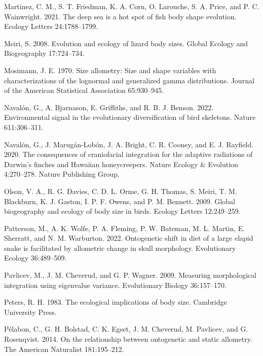 \documentclass[
  11pt,
]{article}
\begin{document}
\leavevmode\hypertarget{ref-Martinez2021}{}%
Martinez, C. M., S. T. Friedman, K. A. Corn, O. Larouche, S. A. Price,
and P. C. Wainwright. 2021. The deep sea is a hot spot of fish body
shape evolution. Ecology Letters 24:1788--1799.

\leavevmode\hypertarget{ref-Meiri2008}{}%
Meiri, S. 2008. Evolution and ecology of lizard body sizes. Global
Ecology and Biogeography 17:724--734.

\leavevmode\hypertarget{ref-Mosimann1970}{}%
Mosimann, J. E. 1970. Size allometry: Size and shape variables with
characterizations of the lognormal and generalized gamma distributions.
Journal of the American Statistical Association 65:930--945.

\leavevmode\hypertarget{ref-Navalon2022}{}%
Navalón, G., A. Bjarnason, E. Griffiths, and R. B. J. Benson. 2022.
Environmental signal in the evolutionary diversification of bird
skeletons. Nature 611:306--311.

\leavevmode\hypertarget{ref-Navalon2020}{}%
Navalón, G., J. Marugán-Lobón, J. A. Bright, C. R. Cooney, and E. J.
Rayfield. 2020. The consequences of craniofacial integration for the
adaptive radiations of Darwin's finches and Hawaiian honeycreepers.
Nature Ecology \& Evolution 4:270--278. Nature Publishing Group.

\leavevmode\hypertarget{ref-Olson2009}{}%
Olson, V. A., R. G. Davies, C. D. L. Orme, G. H. Thomas, S. Meiri, T. M.
Blackburn, K. J. Gaston, I. P. F. Owens, and P. M. Bennett. 2009. Global
biogeography and ecology of body size in birds. Ecology Letters
12:249--259.

\leavevmode\hypertarget{ref-Patterson2022}{}%
Patterson, M., A. K. Wolfe, P. A. Fleming, P. W. Bateman, M. L. Martin,
E. Sherratt, and N. M. Warburton. 2022. Ontogenetic shift in diet of a
large elapid snake is facilitated by allometric change in skull
morphology. Evolutionary Ecology 36:489--509.

\leavevmode\hypertarget{ref-Pavlicev2009}{}%
Pavlicev, M., J. M. Cheverud, and G. P. Wagner. 2009. Measuring
morphological integration using eigenvalue variance. Evolutionary
Biology 36:157--170.

\leavevmode\hypertarget{ref-Peters1983}{}%
Peters, R. H. 1983. The ecological implications of body size. Cambridge
University Press.

\leavevmode\hypertarget{ref-Pelabon2014}{}%
Pélabon, C., G. H. Bolstad, C. K. Egset, J. M. Cheverud, M. Pavlicev,
and G. Rosenqvist. 2014. On the relationship between ontogenetic and
static allometry. The American Naturalist 181:195--212.
\end{document}
